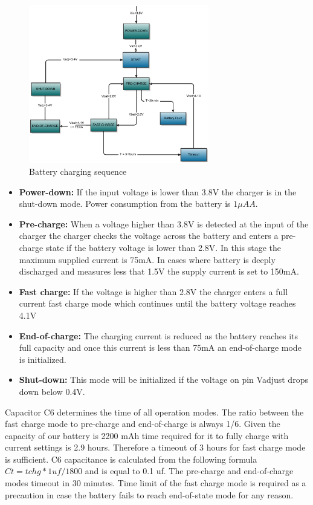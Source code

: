 \begin{figure}
\centering
\includegraphics[width=0.7\textwidth]{Images/battery_charging}
\caption{Battery charging sequence}
\label{fig:charger_sequence}
\end{figure}

\begin{itemize}
\item \textbf{Power-down:} If the input voltage is lower than 3.8V the charger is in the shut-down mode. Power consumption from the battery is $1\mu A A$.
\item \textbf{Pre-charge:} When a voltage higher than 3.8V is detected at the input of the charger the charger checks the voltage across the battery and enters a pre-charge state if the battery voltage is lower than 2.8V. In this stage the maximum supplied current is 75mA. In cases where battery is deeply discharged and measures less that 1.5V the supply current is set to 150mA. 
\item \textbf{Fast charge:} If the voltage is higher than 2.8V the charger enters a full current fast charge mode which continues until the battery voltage reaches 4.1V 
\item \textbf{End-of-charge:} The charging current is reduced as the battery reaches its full capacity and once this current is less than 75mA an end-of-charge mode is initialized. 
\item \textbf{Shut-down:} This mode will be initialized if the voltage on pin Vadjust drops down below 0.4V.
\end{itemize}

Capacitor C6 determines the time of all operation modes. The ratio between the fast charge mode to pre-charge and end-of-charge is always 1/6. Given the capacity of our battery is 2200 mAh time required for it to fully charge with current settings is 2.9 hours. Therefore a timeout of 3 hours for fast charge mode is sufficient. C6 capacitance is calculated from the following formula $Ct = tchg *  1uf / 1800$ and is equal to 0.1 uf. The pre-charge and end-of-charge modes timeout in 30 minutes. Time limit of the fast charge mode is required as a precaution in case the battery fails to reach end-of-state mode for any reason.


